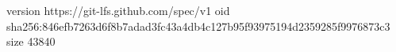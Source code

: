 version https://git-lfs.github.com/spec/v1
oid sha256:846efb7263d6f8b7adad3fc43a4db4c127b95f93975194d2359285f9976873c3
size 43840
